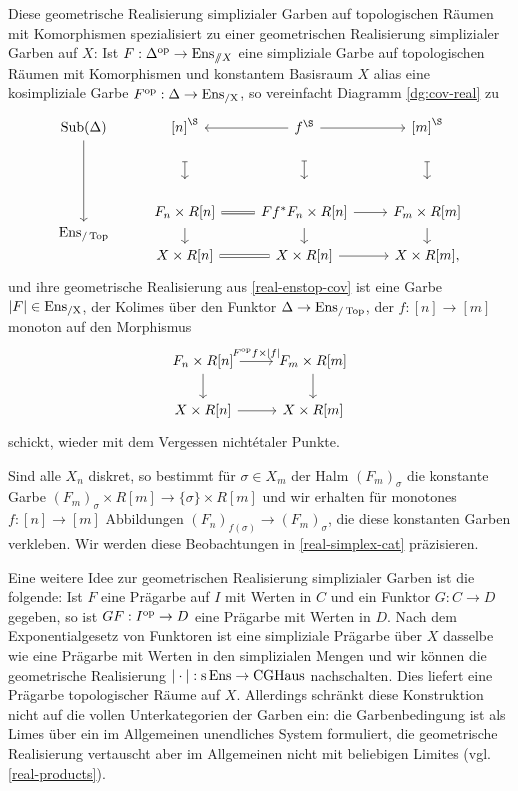 \begin{bem} \label{real-ensx-cov}
  Diese geometrische Realisierung simplizialer Garben auf
  topologischen Räumen mit Komorphismen spezialisiert zu einer
  geometrischen Realisierung simplizialer Garben auf $X$: Ist $F:
  \Delta^\mathrm{op} \to \operatorname{Ens}_{\mathbin{/\mkern-6mu/} X}$ eine simpliziale Garbe auf
  topologischen Räumen mit Komorphismen und konstantem Basisraum $X$
  alias eine kosimpliziale Garbe $F^\mathrm{op}: \Delta \to \operatorname{Ens_{/X}}$, so
  vereinfacht Diagramm \ref{dg:cov-real} zu
  \[
  \begin{tikzcd}
    \Sub(\Delta) \arrow{dd}
    & {[n]}^\S \dar[mapsto, shorten <= 3em, yshift=1.5em]
    & \lar f^\S \dar[mapsto, shorten <= 3em, yshift=1.5em] \rar
    & {[m]}^\S \dar[mapsto, shorten <= 3em, yshift=1.5em] \\[25]
    & F_n \times R[n]
    & \lar[equal] Ff^* F_n \times R[n] \rar
    & F_m \times R[m] \\[-2em]
    \Ens_{/\Top}
    & \dar[shorten <= -1em]
    & \dar[shorten <= -1em]
    & \dar[shorten <= -1em] \\[-2em]
    & X \times R[n]
    & \lar[equal] X \times R[n] \rar
    & X \times R[m],
  \end{tikzcd}
  \]
  und ihre geometrische Realisierung aus \ref{real-enstop-cov} ist
  eine Garbe $|F| \in \operatorname{Ens_{/X}}$, der Kolimes über den Funktor $\Delta \to
  \operatorname{Ens}_{/\operatorname{Top}}$, der $f: [n] \to [m]$ monoton auf den Morphismus
  \[ \begin{tikzcd}
    F_n \times R[n] \dar \rar{F\op f \times |f|}
    & F_m \times R[m] \dar \\
    X \times R[n] \rar
    & X \times R[m]
  \end{tikzcd} \]
  schickt, wieder mit dem Vergessen nichtétaler Punkte.

  Sind alle $X_n$ diskret, so bestimmt für $\sigma \in X_m$ der Halm
  $(F_m)_\sigma$ die konstante Garbe $(F_m)_\sigma \times R[m] \to
  \{\sigma\} \times R[m]$ und wir erhalten für monotones $f: [n] \to
  [m]$ Abbildungen $(F_n)_{f(\sigma)} \to (F_m)_\sigma$, die diese
  konstanten Garben verkleben. Wir werden diese Beobachtungen in
  \ref{real-simplex-cat} präzisieren.
\end{bem}
\begin{bem}
  Eine weitere Idee zur geometrischen Realisierung simplizialer Garben
  ist die folgende: Ist $F$ eine Prägarbe auf $I$ mit Werten in $C$
  und ein Funktor $G: C \to D$ gegeben, so ist $GF: I^\mathrm{op} \to D$ eine
  Prägarbe mit Werten in $D$. Nach dem Exponentialgesetz von Funktoren
  ist eine simpliziale Prägarbe über $X$ dasselbe wie eine Prägarbe
  mit Werten in den simplizialen Mengen und wir können die
  geometrische Realisierung $|\cdot|: \operatorname{s}\operatorname{Ens} \to \operatorname{CGHaus}$
  nachschalten. Dies liefert eine Prägarbe topologischer Räume auf
  $X$. Allerdings schränkt diese Konstruktion nicht auf die vollen
  Unterkategorien der Garben ein: die Garbenbedingung ist als Limes
  über ein im Allgemeinen unendliches System formuliert, die
  geometrische Realisierung vertauscht aber im Allgemeinen nicht mit
  beliebigen Limites (vgl. \ref{real-products}).
\end{bem}

